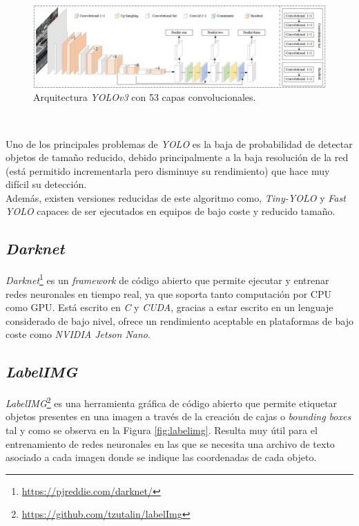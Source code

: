 \begin{figure} [h!]
	\begin{center}
		\includegraphics[width=16cm]{figs/yolov353}
	\end{center}
	\caption{Arquitectura \textit{YOLOv3} con 53 capas convolucionales.}
	\label{fig:yololayers}
\end{figure}\

Uno de los principales problemas de \textit{YOLO} es la baja de probabilidad de detectar objetos de tamaño reducido, debido principalmente a la baja resolución de la red (está permitido incrementarla pero disminuye su rendimiento) que hace muy difícil su detección.\\

Además, existen versiones reducidas de este algoritmo como, \textit{Tiny-YOLO} y \textit{Fast YOLO} capaces de ser ejecutados en equipos de bajo coste y reducido tamaño.\\

\subsection{\textit{Darknet}}
\label{subsection:darknet}
\textit{Darknet}\footnote{\url{https://pjreddie.com/darknet/}} es un \textit{framework} de código abierto que permite ejecutar y entrenar redes neuronales en tiempo real, ya que soporta tanto computación por CPU como GPU. Está escrito en \textit{C} y \textit{CUDA}, gracias a estar escrito en un lenguaje considerado de bajo nivel, ofrece un rendimiento aceptable en plataformas de bajo coste como \textit{NVIDIA Jetson Nano}.\\

\subsection{\textit{LabelIMG}}
\textit{LabelIMG}\footnote{\url{https://github.com/tzutalin/labelImg}} es una herramienta gráfica de código abierto que permite etiquetar objetos presentes en una imagen a través de la creación de cajas o \textit{bounding boxes} tal y como se observa en la Figura \ref{fig:labelimg}. Resulta muy útil para el entrenamiento de redes neuronales en las que se necesita una archivo de texto asociado a cada imagen donde se indique las coordenadas de cada objeto.

